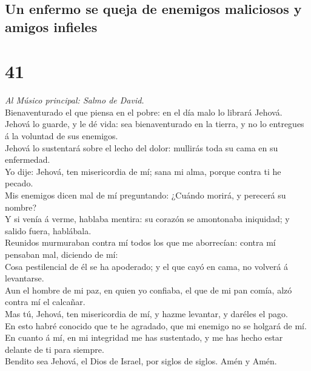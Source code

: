\hypertarget{un-enfermo-se-queja-de-enemigos-maliciosos-y-amigos-infieles}{%
\subsection{Un enfermo se queja de enemigos maliciosos y amigos
infieles}\label{un-enfermo-se-queja-de-enemigos-maliciosos-y-amigos-infieles}}

\hypertarget{section-40}{%
\section{41}\label{section-40}}

 \emph{Al Músico principal: Salmo de David.}\\
Bienaventurado el que piensa en el pobre: en el día malo lo librará
Jehová.\\
 Jehová lo guarde, y le dé vida: sea bienaventurado en la
tierra, y no lo entregues á la voluntad de sus enemigos.\\
 Jehová lo sustentará sobre el lecho del dolor: mullirás
toda su cama en su enfermedad.\\
 Yo dije: Jehová, ten misericordia de mí; sana mi alma,
porque contra ti he pecado.\\
 Mis enemigos dicen mal de mí preguntando: ¿Cuándo morirá, y
perecerá su nombre?\\
 Y si venía á verme, hablaba mentira: su corazón se
amontonaba iniquidad; y salido fuera, hablábala.\\
 Reunidos murmuraban contra mí todos los que me aborrecían:
contra mí pensaban mal, diciendo de mí:\\
 Cosa pestilencial de él se ha apoderado; y el que cayó en
cama, no volverá á levantarse.\\
 Aun el hombre de mi paz, en quien yo confiaba, el que de mi
pan comía, alzó contra mí el calcañar.\\
 Mas tú, Jehová, ten misericordia de mí, y hazme levantar,
y daréles el pago.\\
 En esto habré conocido que te he agradado, que mi enemigo
no se holgará de mí.\\
 En cuanto á mí, en mi integridad me has sustentado, y me
has hecho estar delante de ti para siempre.\\
 Bendito sea Jehová, el Dios de Israel, por siglos de
siglos. Amén y Amén.

